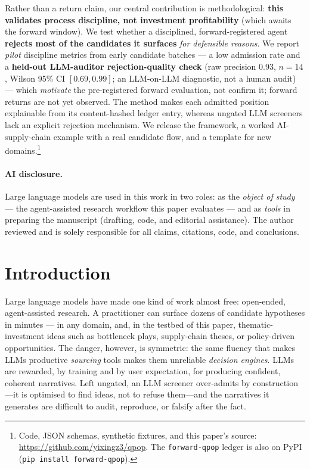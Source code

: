\documentclass[11pt]{article}
\renewenvironment{abstract}{\begin{center}\bfseries\abstractname\end{center}\par\noindent\ignorespaces}{\par\medskip}
\begin{document}
\begin{abstract}
Rather than a return claim, our central contribution is methodological: \textbf{this validates
process discipline, not investment profitability} (which awaits the forward window). We test whether
a disciplined, forward-registered agent \textbf{rejects most of the candidates it surfaces}
\emph{for defensible reasons}. We report \emph{pilot} discipline metrics from early candidate batches
--- a low admission rate and a \textbf{held-out LLM-auditor rejection-quality check} (raw
precision 0.93, $n{=}14$, Wilson 95\% CI $[0.69,0.99]$; an LLM-on-LLM diagnostic, not a human audit) ---
which \emph{motivate} the pre-registered forward evaluation, not confirm it; forward returns are not
yet observed. The method makes each admitted position
explainable from its content-hashed ledger entry, whereas ungated LLM screeners lack an
explicit rejection mechanism. We release the framework, a worked AI-supply-chain example with a real
candidate flow, and a template for new domains.\footnote{Code, JSON schemas, synthetic fixtures, and
this paper's source: \url{https://github.com/yixingz3/qpop}. The \texttt{forward-qpop} ledger is also
on PyPI (\texttt{pip install forward-qpop}).}
\end{abstract}

\paragraph{AI disclosure.} Large language models are used in this work in two roles: as the \emph{object of study} --- the agent-assisted research workflow this paper evaluates --- and as \emph{tools} in preparing the manuscript (drafting, code, and editorial assistance). The author reviewed and is solely responsible for all claims, citations, code, and conclusions.

\section{Introduction}

Large language models have made one kind of work almost free: open-ended, agent-assisted research.
A practitioner can surface dozens of candidate hypotheses in minutes --- in any domain, and, in the
testbed of this paper, thematic-investment ideas such as bottleneck plays, supply-chain theses, or
policy-driven opportunities.
The danger, however, is symmetric: the same fluency that makes LLMs productive \emph{sourcing}
tools makes them unreliable \emph{decision engines}.
LLMs are rewarded, by training and by user expectation, for producing confident, coherent
narratives.
Left ungated, an LLM screener over-admits by construction---it is optimised to find ideas,
not to refuse them---and the narratives it generates are difficult to audit, reproduce, or
falsify after the fact.
\end{document}
